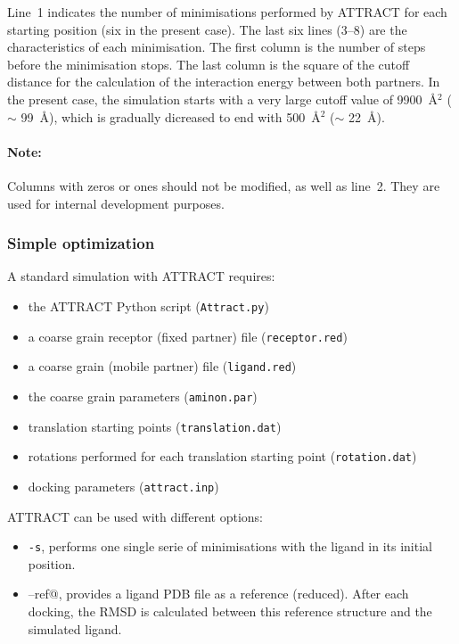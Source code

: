 \documentclass[12pt,a4paper]{article}
\begin{document}
Line~1 indicates the number of minimisations performed by ATTRACT
for each starting position (six in the present case). The last six lines (3--8) 
are the characteristics of
each minimisation. The first column is the number of steps before the
minimisation stops.  The last column is the square of the cutoff distance
for the calculation of the interaction energy between both partners. 
In the present case, the simulation starts with a very large cutoff value of 9900~\AA$^2$ 
($\sim$ 99~\AA), which is gradually dicreased
to end with 500~\AA$^2$ ($\sim$ 22~\AA).

\paragraph{Note:} Columns with zeros or ones should not be modified, as
well as line~2. They are used for internal development purposes.

\subsubsection{Simple optimization}

A standard simulation with ATTRACT requires:
\begin{itemize}
\item the ATTRACT Python script ({\tt  Attract.py})
\item a coarse grain receptor (fixed partner) file ({\tt receptor.red})
\item a coarse grain (mobile partner) file ({\tt ligand.red})
\item the coarse grain parameters ({\tt aminon.par})
\item translation starting points ({\tt translation.dat})
\item rotations performed for each translation starting point ({\tt rotation.dat})
\item docking parameters ({\tt attract.inp})
\end{itemize}

ATTRACT can be used with different options:
\begin{itemize}
\item {\tt -s}, performs one single serie of minimisations with the ligand in its initial position.
\item \verb@--ref@, provides a ligand PDB file as a reference (reduced). After each docking, the RMSD is calculated between this reference structure and the simulated ligand.
\end{itemize}
\end{document}
